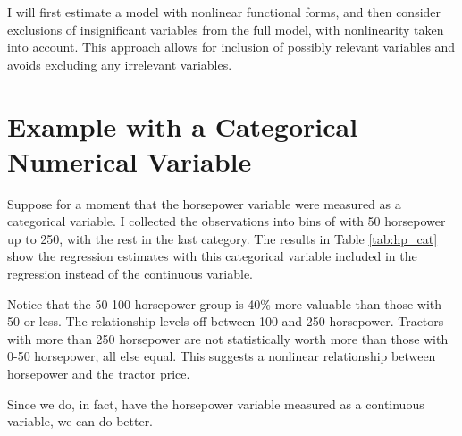 \documentclass[11pt]{paper}
\begin{document}
I will first estimate a model with nonlinear functional forms, and then consider exclusions of insignificant variables from the full model, with nonlinearity taken into account. 
This approach allows for inclusion of possibly relevant variables and avoids excluding any irrelevant variables. 




\section{Example with a Categorical Numerical Variable}


Suppose for a moment that the horsepower variable were measured
as a categorical variable.
I collected the observations into bins of with 50 horsepower
up to 250, with the rest in the last category.
The results in Table \ref{tab:hp_cat}
show the regression estimates with this categorical variable
included in the regression instead of the continuous variable.



Notice that the 50-100-horsepower group is 40\% more valuable
than those with 50 or less.
The relationship levels off between 100 and 250 horsepower.
Tractors with more than 250 horsepower are not statistically
worth more than those with 0-50 horsepower, all else equal.
This suggests a nonlinear relationship between horsepower and
the tractor price. 

Since we do, in fact, 
have the horsepower variable
measured as a continuous variable, we can do better.




%
%
%
%
%
%
\end{document}
